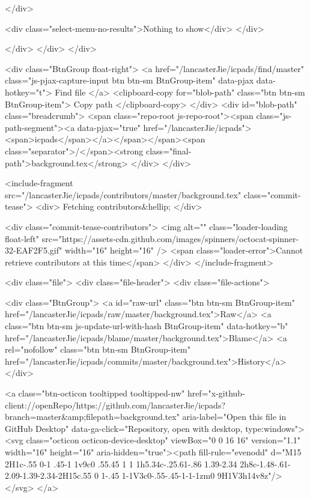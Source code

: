         </div>

        <div class="select-menu-no-results">Nothing to show</div>
      </div>

    </div>
  </div>
</div>

    <div class="BtnGroup float-right">
      <a href="/lancasterJie/icpads/find/master"
            class="js-pjax-capture-input btn btn-sm BtnGroup-item"
            data-pjax
            data-hotkey="t">
        Find file
      </a>
      <clipboard-copy for="blob-path" class="btn btn-sm BtnGroup-item">
        Copy path
      </clipboard-copy>
    </div>
    <div id="blob-path" class="breadcrumb">
      <span class="repo-root js-repo-root"><span class="js-path-segment"><a data-pjax="true" href="/lancasterJie/icpads"><span>icpads</span></a></span></span><span class="separator">/</span><strong class="final-path">background.tex</strong>
    </div>
  </div>


  <include-fragment src="/lancasterJie/icpads/contributors/master/background.tex" class="commit-tease">
    <div>
      Fetching contributors&hellip;
    </div>

    <div class="commit-tease-contributors">
      <img alt="" class="loader-loading float-left" src="https://assets-cdn.github.com/images/spinners/octocat-spinner-32-EAF2F5.gif" width="16" height="16" />
      <span class="loader-error">Cannot retrieve contributors at this time</span>
    </div>
</include-fragment>


  <div class="file">
    <div class="file-header">
  <div class="file-actions">

    <div class="BtnGroup">
      <a id="raw-url" class="btn btn-sm BtnGroup-item" href="/lancasterJie/icpads/raw/master/background.tex">Raw</a>
        <a class="btn btn-sm js-update-url-with-hash BtnGroup-item" data-hotkey="b" href="/lancasterJie/icpads/blame/master/background.tex">Blame</a>
      <a rel="nofollow" class="btn btn-sm BtnGroup-item" href="/lancasterJie/icpads/commits/master/background.tex">History</a>
    </div>

        <a class="btn-octicon tooltipped tooltipped-nw"
           href="x-github-client://openRepo/https://github.com/lancasterJie/icpads?branch=master&amp;filepath=background.tex"
           aria-label="Open this file in GitHub Desktop"
           data-ga-click="Repository, open with desktop, type:windows">
            <svg class="octicon octicon-device-desktop" viewBox="0 0 16 16" version="1.1" width="16" height="16" aria-hidden="true"><path fill-rule="evenodd" d="M15 2H1c-.55 0-1 .45-1 1v9c0 .55.45 1 1 1h5.34c-.25.61-.86 1.39-2.34 2h8c-1.48-.61-2.09-1.39-2.34-2H15c.55 0 1-.45 1-1V3c0-.55-.45-1-1-1zm0 9H1V3h14v8z"/></svg>
        </a>

